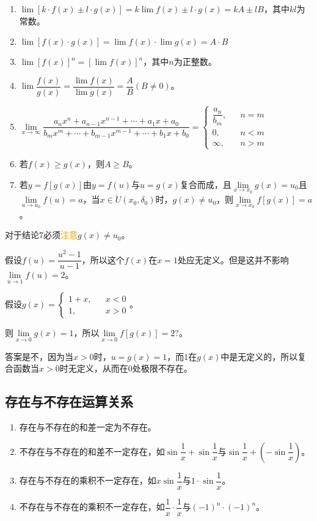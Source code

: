 \documentclass[UTF8, 12pt]{ctexart}
\begin{document}
\begin{enumerate}
    \item $\lim[k\cdot f(x)\pm l\cdot g(x)]=k\lim f(x)\pm l\cdot g(x)=kA\pm lB$，其中$kl$为常数。
    \item $\lim[f(x)\cdot g(x)]=\lim f(x)\cdot\lim g(x)=A\cdot B$
    \item $\lim[f(x)]^n=[\lim f(x)]^n$，其中$n$为正整数。
    \item $\lim\dfrac{f(x)}{g(x)}=\dfrac{\lim f(x)}{\lim g(x)}=\dfrac{A}{B}(B\neq 0)$。
    \item $\lim\limits_{x\to\infty}\dfrac{a_nx^n+a_{n-1}x^{n-1}+\cdots+a_1x+a_0}{b_mx^m+\cdots+b_{m-1}x^{m-1}+\cdots+b_1x+b_0}=\left\{
        \begin{array}{lcl}
            \dfrac{a_n}{b_m}, & & n=m \\
            0, & & n<m \\
            \infty, & & n>m
        \end{array}
    \right.$
    \item 若$f(x)\geqslant g(x)$，则$A\geqslant B$。
    \item 若$y=f[g(x)]$由$y=f(u)$与$u=g(x)$复合而成，且$\lim\limits_{x\to x_0}g(x)=u_0$且$\lim\limits_{u\to u_0}f(u)=a$，当$x\in\mathring{U}(x_0,\delta_0)$时，$g(x)\neq u_0$，则$\lim\limits_{x\to x_0}f[g(x)]=a$。 
\end{enumerate}

对于结论7必须\textcolor{orange}{注意}$g(x)\neq u_0$。

假设$f(u)=\dfrac{u^2-1}{u-1}$，所以这个$f(x)$在$x=1$处应无定义。但是这并不影响$\lim\limits_{u\to 1}f(u)=2$。

假设$g(x)=\left\{
    \begin{array}{lcl}
        1+x, & & x<0 \\
        1, & & x>0
    \end{array}
\right.$。

则$\lim\limits_{x\to 0}g(x)=1$，所以$\lim\limits_{x\to 0}f[g(x)]=2?$。

答案是不，因为当$x>0$时，$u=g(x)=1$，而$1$在$g(x)$中是无定义的，所以复合函数当$x>0$时无定义，从而在$0$处极限不存在。

\subsection{存在与不存在运算关系}

\begin{enumerate}
    \item 存在与不存在的和差一定为不存在。
    \item 不存在与不存在的和差不一定存在，如$\sin\dfrac{1}{x}+\sin\dfrac{1}{x}$与$\sin\dfrac{1}{x}+\left(-\sin\dfrac{1}{x}\right)$。
    \item 存在与不存在的乘积不一定存在，如$x\sin\dfrac{1}{x}$与$1\cdot\sin\dfrac{1}{x}$。
    \item 不存在与不存在的乘积不一定存在，如$\dfrac{1}{x}\cdot\dfrac{1}{x}$与$(-1)^n\cdot(-1)^n$。
\end{enumerate}
\end{document}
